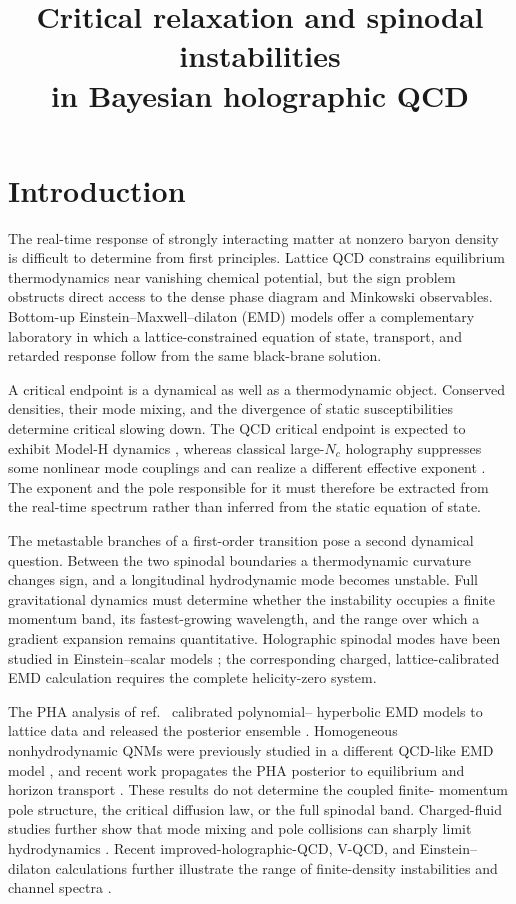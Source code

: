 \documentclass[11pt,a4paper]{article}
\title{Critical relaxation and spinodal instabilities\\
in Bayesian holographic QCD}
\begin{document}
\maketitle
\flushbottom

\section{Introduction}
\label{sec:introduction}

The real-time response of strongly interacting matter at nonzero baryon
density is difficult to determine from first principles.  Lattice QCD
constrains equilibrium thermodynamics near vanishing chemical potential, but
the sign problem obstructs direct access to the dense phase diagram and
Minkowski observables.  Bottom-up Einstein--Maxwell--dilaton (EMD) models offer
a complementary laboratory in which a lattice-constrained equation of state,
transport, and retarded response follow from the same black-brane solution.

A critical endpoint is a dynamical as well as a thermodynamic object.
Conserved densities, their mode mixing, and the divergence of static
susceptibilities determine critical slowing down.  The QCD critical endpoint
is expected to exhibit Model-H dynamics \cite{Hohenberg:1977ym,Son:2004iv},
whereas classical large-$N_c$ holography suppresses some nonlinear mode
couplings and can realize a different effective exponent
\cite{DeWolfe:2011ts,Roth:2024hpn}.  The exponent and the pole responsible for it must
therefore be extracted from the real-time spectrum rather than inferred from
the static equation of state.

The metastable branches of a first-order transition pose a second dynamical
question.  Between the two spinodal boundaries a thermodynamic curvature
changes sign, and a longitudinal hydrodynamic mode becomes unstable.  Full
gravitational dynamics must determine whether the instability occupies a
finite momentum band, its fastest-growing wavelength, and the range over
which a gradient expansion remains quantitative.  Holographic spinodal modes
have been studied in Einstein--scalar models
\cite{Janik:2015waa,Janik:2016btb,Caddeo:2024qgm}; the corresponding charged,
lattice-calibrated EMD calculation requires the complete helicity-zero system.

The PHA analysis of ref.~\cite{Hippert:2023bel} calibrated polynomial--
hyperbolic EMD models to lattice data and released the posterior ensemble
\cite{HippertZenodo}.  Homogeneous nonhydrodynamic QNMs were previously
studied in a different QCD-like EMD model \cite{Rougemont:2018taa}, and recent
work propagates the PHA posterior to equilibrium and horizon transport
\cite{Khan:2026uq}.  These results do not determine the coupled finite-
momentum pole structure, the critical diffusion law, or the full spinodal
band.  Charged-fluid studies further show that mode mixing and pole collisions
can sharply limit hydrodynamics \cite{Abbasi:2020ykq,Jansen:2020hfd}.
Recent improved-holographic-QCD, V-QCD, and Einstein--dilaton calculations
further illustrate the range of finite-density instabilities and channel
spectra \cite{Alho:2020gwl,CruzRojas:2024lwo,Villarreal:2025qtm}.
\end{document}
